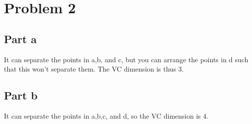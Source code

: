 \documentclass[twoside,11pt]{article}
\theoremstyle{definition}
\begin{document}
\section*{Problem 2}

\subsection*{Part a}

It can separate the points in a,b, and c, but you can arrange the points in d such that this won't separate them. The VC dimension is thus 3.

\subsection*{Part b}

It can separate the points in a,b,c, and d, so the VC dimension is 4.
\end{document}
